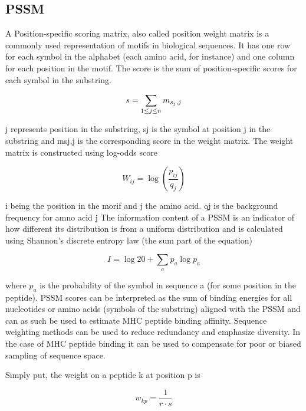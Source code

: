 
\subsection*{PSSM}
A Position-specific scoring matrix, also called position weight matrix is a commonly used representation of motifs in biological sequences. It has one row for each symbol in the alphabet (each amino acid, for instance) and one column for each position in the motif. The score is the sum of position-specific scores for each symbol in the substring.

\begin{equation}
s = \sum_{1\leq j\leq n}{m_{s_j,j}} \\
\end{equation}

j represents position in the substring, sj is the symbol at position j in the substring and msj,j is the corresponding score in the weight matrix. The weight matrix is constructed using log-odds score

\begin{equation}
W_{ij} = \log{ (\frac{p_{ij}}{q_j}) }
\end{equation}

i being the position in the morif and j the amino acid. qj is the background frequency for amno acid j
The information content of a PSSM is an indicator of how different its distribution is from a uniform distribution and is calculated using Shannon's discrete entropy law (the sum part of the equation)

\begin{equation}
\label{info}
I = \log{ 20 } + \sum_{a}{ p_{a}\log{p_{a}} }
\end{equation}

where $p_a$ is the probability of the symbol in sequence a (for some position in the peptide).
PSSM scores can be interpreted as the sum of binding energies for all nucleotides or amino acids (symbols of the substring) aligned with the PSSM and can as such be used to estimate MHC peptide binding affinity.
Sequence weighting methods can be used to reduce redundancy and emphasize diversity. In the case of MHC peptide binding it can be used to compensate for poor or biased sampling of sequence space.

Simply put, the weight on a peptide k at position p is

\begin{equation}
w_{kp} = \frac{1}{r\cdot s}
\end{equation}

